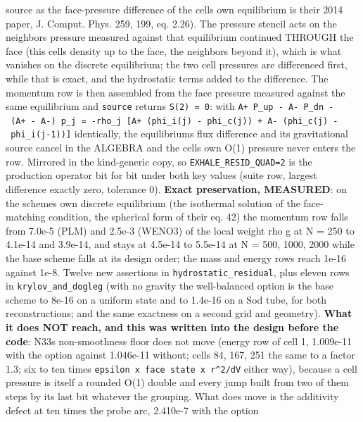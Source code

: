 \documentclass[english,a4paper]{my_memo}
\begin{document}
\begin{itemize}
  source as the face-pressure difference of the cell\textquotesingle s own equilibrium is
  their 2014 paper, J. Comput. Phys. 259, 199, eq. 2.26). The pressure
  stencil acts on the neighbor\textquotesingle s pressure measured against that
  equilibrium continued THROUGH the face (this cell\textquotesingle s density up to the
  face, the neighbor\textquotesingle s beyond it), which is what vanishes on the discrete
  equilibrium; the two cell pressures are differenced first, while that is
  exact, and the hydrostatic terms added to the difference. The momentum
  row is then assembled from the face pressure measured against the same
  equilibrium and \texttt{source} returns \texttt{S(2)\ =\ 0}: with
  \texttt{A+\ P\_up\ -\ A-\ P\_dn\ -\ (A+\ -\ A-)\ p\_j\ =\ -rho\_j\ {[}A+\ (phi\_i(j)\ -\ phi\_c(j))\ +\ A-\ (phi\_c(j)\ -\ phi\_i(j-1)){]}} identically, the equilibrium\textquotesingle s flux
  difference and its gravitational source cancel in the ALGEBRA and the
  cell\textquotesingle s own O(1) pressure never enters the row. Mirrored in the
  kind-generic copy, so \texttt{EXHALE\_RESID\_QUAD=2} is the production operator
  bit for bit under both key values (suite row, largest difference exactly
  zero, tolerance 0). \textbf{Exact preservation, MEASURED}: on the scheme\textquotesingle s own
  discrete equilibrium (the isothermal solution of the face-matching
  condition, the spherical form of their eq. 42) the momentum row falls
  from 7.0e-5 (PLM) and 2.5e-3 (WENO3) of the local weight rho g at
  N = 250 to 4.1e-14 and 3.9e-14, and stays at 4.5e-14 to 5.5e-14 at
  N = 500, 1000, 2000 while the base scheme falls at its design order; the
  mass and energy rows reach 1e-16 against 1e-8. Twelve new assertions in
  \texttt{hydrostatic\_residual}, plus eleven rows in \texttt{krylov\_and\_dogleg} (with no
  gravity the well-balanced option is the base scheme to 8e-16 on a uniform state and to
  1.4e-16 on a Sod tube, for both reconstructions; and the same exactness
  on a second grid and geometry). \textbf{What it does NOT reach, and this was
  written into the design before the code}: N33\textquotesingle s non-smoothness floor
  does not move (energy row of cell 1, 1.009e-11 with the option against
  1.046e-11 without; cells 84, 167, 251 the same to a factor 1.3; six to
  ten times \texttt{epsilon\ x\ face\ state\ x\ r\^{}2/dV} either way), because a cell
  pressure is itself a rounded O(1) double and every jump built from two of
  them steps by its last bit whatever the grouping. What does move is the
  additivity defect at ten times the probe arc, 2.410e-7 with the option

\end{itemize}
\end{document}
